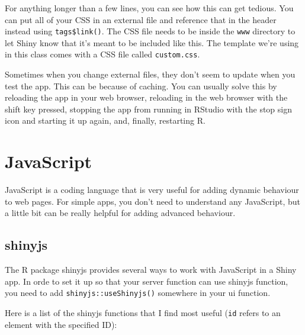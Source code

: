 \documentclass[
]{book}
\newenvironment{Shaded}{\begin{snugshade}}{\end{snugshade}}
\newcommand{\AttributeTok}[1]{\textcolor[rgb]{0.77,0.63,0.00}{#1}}
\newcommand{\FunctionTok}[1]{\textcolor[rgb]{0.00,0.00,0.00}{#1}}
\newcommand{\NormalTok}[1]{#1}
\newcommand{\SpecialCharTok}[1]{\textcolor[rgb]{0.00,0.00,0.00}{#1}}
\newcommand{\StringTok}[1]{\textcolor[rgb]{0.31,0.60,0.02}{#1}}
\begin{document}
For anything longer than a few lines, you can see how this can get tedious. You can put all of your CSS in an external file and reference that in the header instead using \texttt{tags\$link()}. The CSS file needs to be inside the \texttt{www} directory to let Shiny know that it's meant to be included like this. The template we're using in this class comes with a CSS file called \texttt{custom.css}.

\begin{Shaded}
\end{Shaded}

Sometimes when you change external files, they don't seem to update when you test the app. This can be because of caching. You can usually solve this by reloading the app in your web browser, reloading in the web browser with the shift key pressed, stopping the app from running in RStudio with the stop sign icon and starting it up again, and, finally, restarting R.

\hypertarget{javascript}{%
\section{JavaScript}\label{javascript}}

JavaScript is a coding language that is very useful for adding dynamic behaviour to web pages. For simple apps, you don't need to understand any JavaScript, but a little bit can be really helpful for adding advanced behaviour.

\hypertarget{shinyjs}{%
\subsection{shinyjs}\label{shinyjs}}

The R package shinyjs provides several ways to work with JavaScript in a Shiny app. In orde to set it up so that your server function can use shinyjs function, you need to add \texttt{shinyjs::useShinyjs()} somewhere in your ui function.

Here is a list of the shinyjs functions that I find most useful (\texttt{id} refers to an element with the specified ID):
\end{document}
